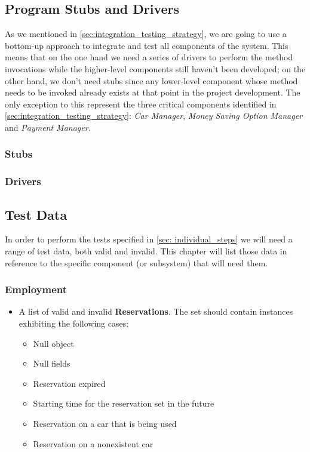 	\subsection{Program Stubs and Drivers}
	
	As we mentioned in \autoref{sec:integration_testing_strategy}, we are going to use a bottom-up approach to integrate and test all components of the system. This means that on the one hand we need a series of drivers to perform the method invocations while the higher-level components still haven't been developed; on the other hand, we don't need stubs since any lower-level component whose method needs to be invoked already exists at that point in the project development. The only exception to this represent the three critical components identified in \autoref{sec:integration_testing_strategy}: \textit{Car Manager}, \textit{Money Saving Option Manager} and \textit{Payment Manager}.
	
		\subsubsection{Stubs}
		
		
		\subsubsection{Drivers}
		
	
	
	
	\subsection{Test Data}
	
	In order to perform the tests specified in \autoref{sec: individual_steps} we will need a range of test data, both valid and invalid. This chapter will list those data in reference to the specific component (or subsystem) that will need them. %
	
	
	
		\subsubsection{Employment}
		
		\begin{itemize}
			\item A list of valid and invalid \textbf{Reservations}. The set should contain instances exhibiting the following cases:
				\begin{itemize}
					\item Null object
					\item Null fields
					\item Reservation expired
					\item Starting time for the reservation set in the future
					\item Reservation on a car that is being used
					\item Reservation on a nonexistent car
				\end{itemize}
		\end{itemize}
		
